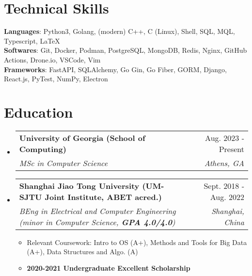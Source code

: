 \documentclass[letterpaper,11pt]{article}
\makeatletter
\newcommand{\resumeItem}[1]{
  \item\small{
    {#1 \vspace{-2pt}}
  }
}
\newcommand{\resumeSubHeader}[4]{
  \vspace{-2pt}\item
    \begin{tabular*}{0.98\textwidth}[t]{l@{\extracolsep{\fill}}r}
      \textbf{#1} & #2 \\
      \textit{\small#3} & \textit{\small #4} \\
    \end{tabular*}\vspace{-7pt}
}
\newcommand{\resumeSubHeaderListStart}{\begin{itemize}[leftmargin=0.15in, label={}]}
\newcommand{\resumeSubHeaderListEnd}{\end{itemize}}
\newcommand{\resumeItemListStart}{\begin{itemize}}
\newcommand{\resumeItemListEnd}{\end{itemize}\vspace{-5pt}}
\makeatother
\begin{document}
\section{Technical Skills}
 \begin{itemize}[leftmargin=0.15in, label={}]
  \setlength\itemsep{0em}
    \small{
      \setlength\itemsep{0em}
      \item{
     \textbf{Languages}{: Python3, Golang, (modern) C++, C (Linux), Shell, SQL, MQL, Typescript, \LaTeX} \\
     \textbf{Softwares}{: Git, Docker, Podman, PostgreSQL, MongoDB, Redis, Nginx, GitHub Actions, Drone.io, VSCode, Vim} \\
     \textbf{Frameworks}{: FastAPI, SQLAlchemy, Go Gin, Go Fiber, GORM, Django, React.js, PyTest, NumPy, Electron} \\
    }}
 \end{itemize}

\section{Education}
  \resumeSubHeaderListStart
    \resumeSubHeader
      {University of Georgia (School of Computing)}{Aug. 2023 - Present}
      {MSc in Computer Science}{Athens, GA}
    \resumeSubHeader
      {Shanghai Jiao Tong University (UM-SJTU Joint Institute, ABET acred.)}{Sept. 2018 - Aug. 2022}
      {BEng in Electrical and Computer Engineering (minor in Computer Science, \textbf{GPA 4.0/4.0})}{Shanghai, China}
          \resumeItemListStart
            \resumeItem{Relevant Coursework: Intro to OS (A+), Methods and Tools for Big Data (A+), Data Structures and Algo. (A)}
            \resumeItem{\textbf{2020-2021 Undergraduate Excellent Scholarship}}
          \resumeItemListEnd
  \resumeSubHeaderListEnd

\end{document}
